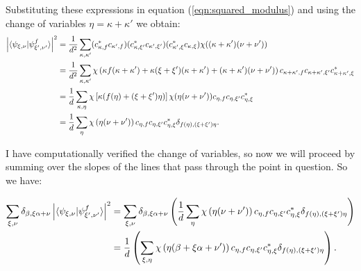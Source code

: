 \documentclass[a4paper]{article}
\begin{document}
  Substituting these expressions in equation
  (\ref{eqn:squared_modulus}) and using the change of
  variables $\eta = \kappa + \kappa'$ we obtain:
  \begin{align}
    \left|\braket{\psi_{\xi,\nu}|\psi_{\xi',\nu'}^f}\right|^2
    &= \frac{1}{d^2} 
    \sum_{\kappa,\kappa'}^{}  
    (c_{\kappa,f}^* c_{\kappa',f})
    (c_{\kappa,\xi'}^* c_{\kappa',\xi'})
    (c_{\kappa',\xi}^* c_{\kappa,\xi})
    \chi((\kappa+\kappa')(\nu+\nu')) \\
    &= \frac{1}{d^2} \sum_{\kappa,\kappa'}^{} 
    \chi\left( \kappa f(\kappa+\kappa') + 
      \kappa(\xi + \xi')(\kappa+\kappa')
    +(\kappa+\kappa') (\nu+\nu') \right)
    c_{\kappa+\kappa',f} c_{\kappa+\kappa',\xi'}
    c_{\kappa+\kappa',\xi}^* \\
    &= \frac{1}{d} \sum_{\kappa,\eta}^{} 
    \chi\left[
      \kappa(f(\eta) + (\xi+\xi')\eta)
    \right]
    \chi(\eta(\nu+\nu'))
    c_{\eta,f} c_{\eta,\xi'} c_{\eta,\xi}^* \\
    &= \frac{1}{d} \sum_{\eta}^{} 
    \chi\left( \eta(\nu+\nu') \right) 
    c_{\eta,f}c_{\eta,\xi'}c_{\eta,\xi}^* 
    \delta_{f(\eta), (\xi+\xi')\eta}.
  \end{align}

  I have computationally verified the change of variables,
  so now we will proceed by summing over the slopes of the
  lines that pass through the point in question. So we have:

  \begin{align}
    \sum_{\xi,\nu}^{} 
    \delta_{\beta,\xi\alpha+\nu}
    \left|
    \braket{\psi_{\xi,\nu}|\psi_{\xi',\nu'}^f}
    \right|^2
    &= \sum_{\xi,\nu}^{} 
    \delta_{\beta,\xi\alpha+\nu}
    \left(
      \frac{1}{d} \sum_{\eta}^{} 
      \chi\left( \eta(\nu+\nu') \right) 
      c_{\eta,f}c_{\eta,\xi'}c_{\eta,\xi}^* 
      \delta_{f(\eta), (\xi+\xi')\eta}
    \right) \\
    &= \frac{1}{d}
    \left( 
      \sum_{\xi,\eta}^{} 
      \chi\left( \eta(\beta + \xi\alpha+\nu') \right) 
      c_{\eta,f}c_{\eta,\xi'}c_{\eta,\xi}^* 
      \delta_{f(\eta), (\xi+\xi')\eta}
    \right). 
  \end{align}
\end{document}
